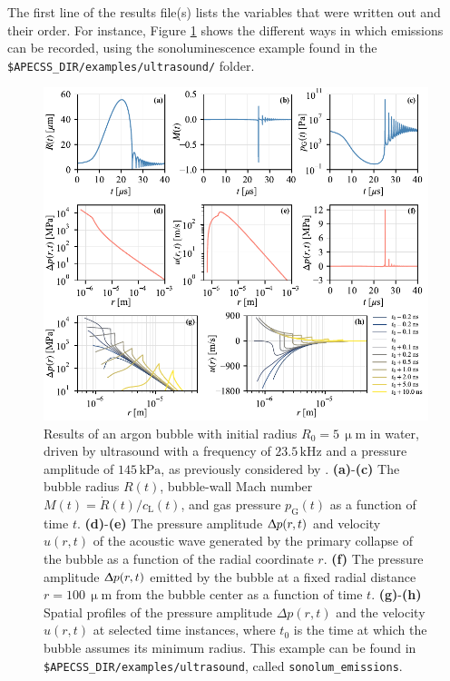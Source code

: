 The first line of the results file(s) lists the variables that were written out and their order. For instance, Figure \ref{fig:emissions_results} shows the different ways in which emissions can be recorded, using the sonoluminescence example found in the {\tt \$APECSS\_DIR/examples/ultrasound/} folder.

\begin{figure}
    \centering
    \includegraphics[width=\linewidth]{./figures/emissions_results.pdf}
    \caption{Results of an argon bubble with initial radius $R_0 = 5 \, \upmu \mathrm{m}$ in water, driven by ultrasound with a frequency of $23.5 \, \mathrm{kHz}$ and a pressure amplitude of $145 \, \mathrm{kPa}$, as previously considered by \citet{Holzfuss2010}. {\bf(a)}-{\bf(c)} The bubble radius $R(t)$, bubble-wall Mach number $M(t)=\dot{R}(t)/c_\mathrm{L}(t)$, and gas pressure $p_\mathrm{G}(t)$ as a function of time $t$. {\bf(d)}-{\bf(e)} The pressure amplitude $\Updelta p(r,t)$ and velocity $u(r,t)$  of the acoustic wave generated by the primary collapse of the bubble as a function of the radial coordinate $r$. {\bf (f)} The pressure amplitude $\Updelta p(r,t)$ emitted by the bubble at a fixed radial distance $r=100 \, \upmu \mathrm{m}$ from the bubble center as a function of time $t$. {\bf(g)}-{\bf(h)} Spatial profiles of the pressure amplitude $\Delta p(r,t)$ and the velocity $u(r,t)$ at selected time instances, where $t_0$ is the time at which the bubble assumes its minimum radius. This example can be found in {\tt \$APECSS\_DIR/examples/ultrasound}, called {\tt sonolum\_emissions}.}
    \label{fig:emissions_results}
\end{figure}
